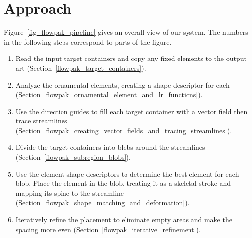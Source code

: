 \section{Approach}
\label{flowpak_approach}



Figure~\ref{fig_flowpak_pipeline} gives an overall view of our system. The numbers in the following
steps correspond to parts of the figure.


\begin{enumerate}
  \item Read the input target containers and
  copy any fixed elements to the output art (Section~\ref{flowpak_target_containers}).
  \item Analyze the ornamental elements, creating a shape descriptor for each
   (Section~\ref{flowpak_ornamental_element_and_lr_functions}).
  \item Use the direction guides to fill each target container with a vector field then trace streamlines 
  (Section~\ref{flowpak_creating_vector_fields_and_tracing_streamlines}).
  \item Divide the target containers into blobs around the streamlines (Section~\ref{flowpak_subregion_blobs}).
  \item Use the element shape descriptors to determine the best element for each blob. 
        Place the element in the blob, treating it as a skeletal stroke and mapping its
        spine to the streamline (Section~\ref{flowpak_shape_matching_and_deformation}).
  \item Iteratively refine the placement to eliminate empty areas and make the spacing more even (Section~\ref{flowpak_iterative_refinement}).
\end{enumerate}

